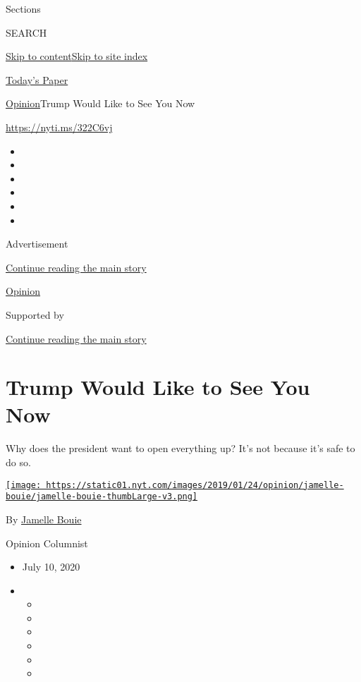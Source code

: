 Sections

SEARCH

\protect\hyperlink{site-content}{Skip to
content}\protect\hyperlink{site-index}{Skip to site index}

\href{https://myaccount.nytimes.com/auth/login?response_type=cookie\&client_id=vi}{}

\href{https://www.nytimes.com/section/todayspaper}{Today's Paper}

\href{/section/opinion}{Opinion}\textbar{}Trump Would Like to See You
Now

\href{https://nyti.ms/322C6vj}{https://nyti.ms/322C6vj}

\begin{itemize}
\item
\item
\item
\item
\item
\item
\end{itemize}

Advertisement

\protect\hyperlink{after-top}{Continue reading the main story}

\href{/section/opinion}{Opinion}

Supported by

\protect\hyperlink{after-sponsor}{Continue reading the main story}

\hypertarget{trump-would-like-to-see-you-now}{%
\section{Trump Would Like to See You
Now}\label{trump-would-like-to-see-you-now}}

Why does the president want to open everything up? It's not because it's
safe to do so.

\href{https://www.nytimes.com/column/jamelle-bouie}{\texttt{[image: https://static01.nyt.com/images/2019/01/24/opinion/jamelle-bouie/jamelle-bouie-thumbLarge-v3.png]}}

By \href{https://www.nytimes.com/column/jamelle-bouie}{Jamelle Bouie}

Opinion Columnist

\begin{itemize}
\item
  July 10, 2020
\item
  \begin{itemize}
  \item
  \item
  \item
  \item
  \item
  \item
  \end{itemize}
\end{itemize}

